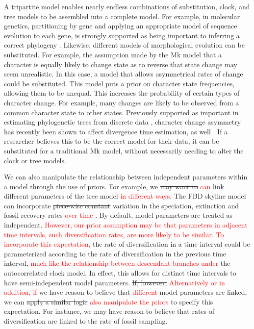 \documentclass[11pt]{article}
\newcommand{\edit}[1]{{\textcolor{red}{#1}}} %
\begin{document}
A tripartite model enables nearly endless combinations of substitution, clock, and tree models to be assembled into a complete model.
For example, in molecular genetics, partitioning by gene and applying an appropriate model of sequence evolution to each gene, is strongly supported as being important to inferring a correct phylogeny \cite{Brandley2005}.
Likewise, different models of morphological evolution can be substituted.
For example, the assumption made by the Mk model that a character is equally likely to change state as to reverse that state change may seem unrealistic. 
In this case, a model that allows asymmetrical rates of change \cite{Ronquist2004} could be substituted. 
 This model puts a prior on character state frequencies, allowing them to be unequal.
 This increases the probability of certain types of character change.
 For example, many changes are likely to be observed from a common character state to other states.
Previously supported as important in estimating phylogenetic trees from discrete data \cite{Wright2016}, character change asymmetry has recently been shown to affect divergence time estimation, as well \cite{Klopfstein2019}. 
If a researcher believes this to be the correct model for their data, it can be substituted for a traditional Mk model, without necessarily needing to alter the clock or tree models. 


We can also manipulate the relationship between independent %
parameters within a model through the use of priors.
For example, we \sout{may want to} \edit{can} link different parameters of the tree model \edit{in different ways}.
The FBD skyline model can incorporate \sout{piece-wise constant} variation in the speciation, extinction and fossil recovery rates \edit{over time} \cite{Gavryushkina2014,Zhang2016}.
By default, model parameters are treated as independent.
\edit{However, our prior assumption may be that parameters in adjacent time intervals, such diversification rates, are more likely to be similar.}
\edit{To incorporate this expectation,} the rate of diversification in a time interval could be parameterized according to the rate of diversification in the previous time interval, \edit{much like the relationship between descendant branches under} the autocorrelated clock model. %
In effect, this allows for distinct time intervals to have semi-independent model parameters.
\sout{If, however,} \edit{Alternatively or in addition, if}  we have reason to believe that \edit{different } model parameters are linked, we can \sout{apply a similar logic} \edit{also manipulate the priors} to specify this expectation.
For instance, we may have reason to believe that rates of diversification are linked to the rate of fossil sampling.
\end{document}
